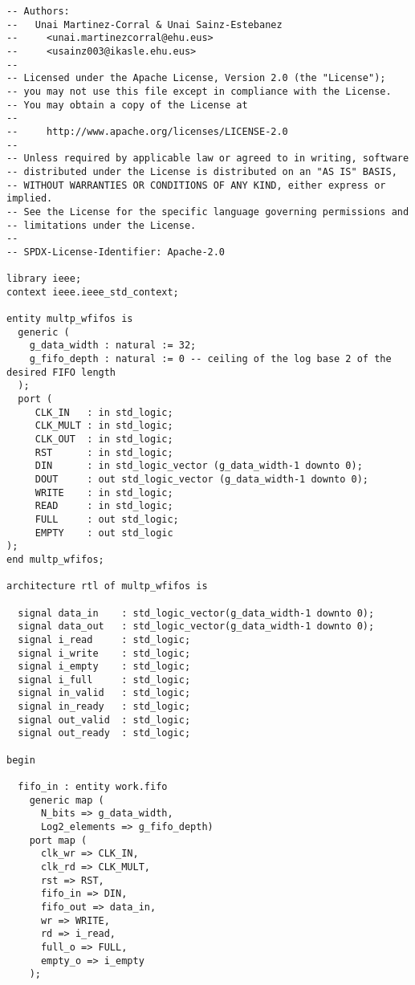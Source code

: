 \begin{code}
\begin{verbatim}
-- Authors:
--   Unai Martinez-Corral & Unai Sainz-Estebanez
--     <unai.martinezcorral@ehu.eus>
--     <usainz003@ikasle.ehu.eus>
--
-- Licensed under the Apache License, Version 2.0 (the "License");
-- you may not use this file except in compliance with the License.
-- You may obtain a copy of the License at
--
--     http://www.apache.org/licenses/LICENSE-2.0
--
-- Unless required by applicable law or agreed to in writing, software
-- distributed under the License is distributed on an "AS IS" BASIS,
-- WITHOUT WARRANTIES OR CONDITIONS OF ANY KIND, either express or implied.
-- See the License for the specific language governing permissions and
-- limitations under the License.
--
-- SPDX-License-Identifier: Apache-2.0

library ieee;
context ieee.ieee_std_context;

entity multp_wfifos is
  generic (
    g_data_width : natural := 32;
    g_fifo_depth : natural := 0 -- ceiling of the log base 2 of the desired FIFO length
  );
  port (
     CLK_IN   : in std_logic;
     CLK_MULT : in std_logic;
     CLK_OUT  : in std_logic;
     RST      : in std_logic;
     DIN      : in std_logic_vector (g_data_width-1 downto 0);
     DOUT     : out std_logic_vector (g_data_width-1 downto 0);
     WRITE    : in std_logic;
     READ     : in std_logic;
     FULL     : out std_logic;
     EMPTY    : out std_logic
);
end multp_wfifos;

architecture rtl of multp_wfifos is

  signal data_in    : std_logic_vector(g_data_width-1 downto 0);
  signal data_out   : std_logic_vector(g_data_width-1 downto 0);
  signal i_read     : std_logic;
  signal i_write    : std_logic;
  signal i_empty    : std_logic;
  signal i_full     : std_logic;
  signal in_valid   : std_logic;
  signal in_ready   : std_logic;
  signal out_valid  : std_logic;
  signal out_ready  : std_logic;

begin

  fifo_in : entity work.fifo
    generic map (
      N_bits => g_data_width,
      Log2_elements => g_fifo_depth)
    port map (
      clk_wr => CLK_IN,
      clk_rd => CLK_MULT,
      rst => RST,
      fifo_in => DIN,
      fifo_out => data_in,
      wr => WRITE,
      rd => i_read,
      full_o => FULL,
      empty_o => i_empty
    );


\end{verbatim}
\end{code}
